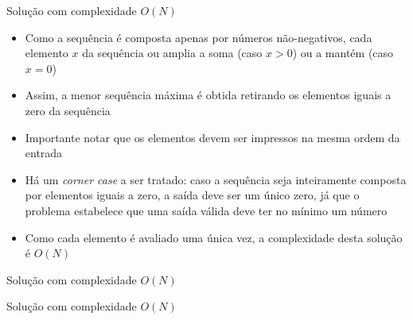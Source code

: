 \begin{frame}[fragile]{Solução com complexidade $O(N)$}

    \begin{itemize}
        \item Como a sequência é composta apenas por números não-negativos, cada elemento $x$
            da sequência ou amplia a soma (caso $x > 0$) ou a mantém (caso $x = 0$)

        \item Assim, a menor sequência máxima é obtida retirando os elementos iguais a zero
            da sequência

        \item Importante notar que os elementos devem ser impressos na mesma ordem da entrada

        \item Há um {\it corner case} a ser tratado: caso a sequência seja inteiramente composta
            por elementos iguais a zero, a saída deve ser um único zero, já que o problema
            estabelece que uma saída válida deve ter no mínimo um número

        \item Como cada elemento é avaliado uma única vez, a complexidade desta solução é $O(N)$
   \end{itemize}

\end{frame}

\begin{frame}[fragile]{Solução com complexidade $O(N)$}
\end{frame}

\begin{frame}[fragile]{Solução com complexidade $O(N)$}
\end{frame}
